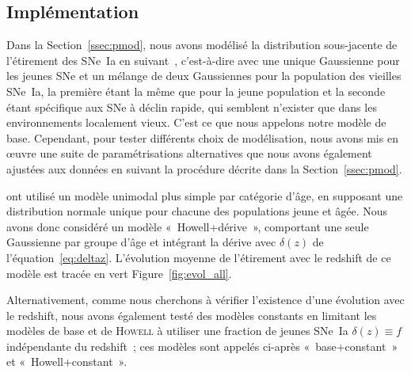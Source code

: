 \documentclass[../main/main.tex]{subfiles}
\begin{document}
\subsection{Implémentation}\label{ssec:modimpl}

Dans la Section~\ref{ssec:pmod}, nous avons modélisé la distribution
sous-jacente de l'étirement des SNe~Ia en suivant~\cite{rigault2020},
c'est-à-dire avec une unique Gaussienne pour les jeunes SNe et un mélange de
deux Gaussiennes pour la population des vieilles SNe~Ia, la première étant la
même que pour la jeune population et la seconde étant spécifique aux SNe à
déclin rapide, qui semblent n'exister que dans les environnements localement
vieux. C'est ce que nous appelons notre modèle de base. Cependant, pour
tester différents choix de modélisation, nous avons mis en œuvre une suite de
paramétrisations alternatives que nous avons également ajustées aux données en
suivant la procédure décrite dans la Section~\ref{ssec:pmod}.

\cite{howell2007} ont utilisé un modèle unimodal plus simple par catégorie
d'âge, en supposant une distribution normale unique pour chacune des populations
jeune et âgée. Nous avons donc considéré un modèle «~Howell+dérive~», comportant
une seule Gaussienne par groupe d'âge et intégrant la dérive avec $\delta(z)$ de
l'équation~\ref{eq:deltaz}. L'évolution moyenne de l'étirement avec le redshift
de ce modèle est tracée en vert Figure~\ref{fig:evol_all}.

Alternativement, comme nous cherchons à vérifier l'existence d'une évolution
avec le redshift, nous avons également testé des modèles constants en limitant
les modèles de base et de \textsc{Howell} à utiliser une fraction de jeunes
SNe~Ia $\delta(z) \equiv f$ indépendante du redshift~; ces modèles sont appelés
ci-après «~base+constant~» et «~Howell+constant~».
\end{document}

